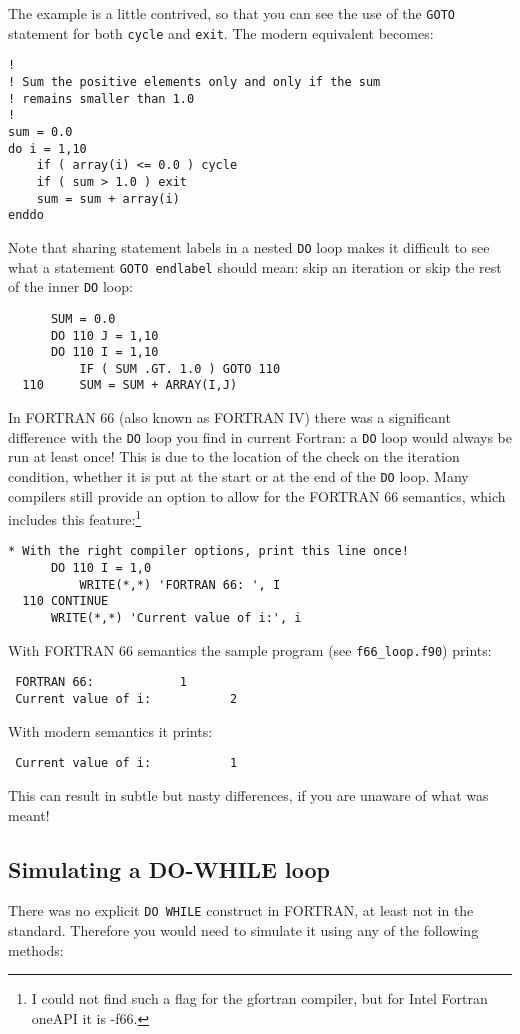 %
The example is a little contrived, so that you can see the use of the \verb+GOTO+ statement
for both \verb+cycle+ and \verb+exit+. The modern equivalent becomes:
%
\begin{verbatim}
!
! Sum the positive elements only and only if the sum
! remains smaller than 1.0
!
sum = 0.0
do i = 1,10
    if ( array(i) <= 0.0 ) cycle
    if ( sum > 1.0 ) exit
    sum = sum + array(i)
enddo
\end{verbatim}
%
Note that sharing statement labels in a nested \verb+DO+ loop makes it difficult to
see what a statement \verb+GOTO endlabel+ should mean: skip an iteration or skip
the rest of the inner \verb+DO+ loop:
%
\begin{verbatim}
      SUM = 0.0
      DO 110 J = 1,10
      DO 110 I = 1,10
          IF ( SUM .GT. 1.0 ) GOTO 110
  110     SUM = SUM + ARRAY(I,J)
\end{verbatim}
%
In FORTRAN 66 (also known as FORTRAN IV) there was a significant difference with
the \verb+DO+ loop you find in current Fortran: a \verb+DO+ loop would always
be run at least once! This is due to the location of the check on the iteration
condition, whether it is put at the start or at the end of the \verb+DO+ loop.
Many compilers still provide an option to allow for the FORTRAN 66 semantics,\cite{Intel}
which includes this feature:\footnote{I could not find such a flag for the
gfortran compiler, but for Intel Fortran oneAPI it is -f66.}
%
\begin{verbatim}
* With the right compiler options, print this line once!
      DO 110 I = 1,0
          WRITE(*,*) 'FORTRAN 66: ', I
  110 CONTINUE
      WRITE(*,*) 'Current value of i:', i
\end{verbatim}
%
With FORTRAN 66 semantics the sample program (see \verb+f66_loop.f90+) prints:
%
\begin{verbatim}
 FORTRAN 66:            1
 Current value of i:           2
\end{verbatim}
With modern semantics it prints:
%
\begin{verbatim}
 Current value of i:           1
\end{verbatim}
%
This can result in subtle but nasty differences, if you are unaware of what
was meant!


\subsection{Simulating a DO-WHILE loop}
There was no explicit \verb+DO WHILE+ construct in FORTRAN, at least not
in the standard. Therefore you would need to simulate it using any of the
following methods:


